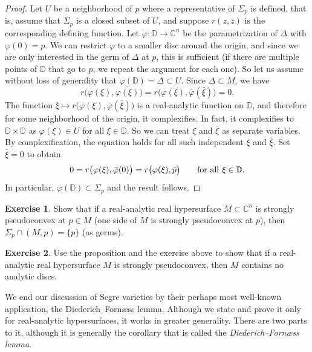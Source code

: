 \documentclass[12pt,openany]{book}
\newcommand{\avoidbreak}{\postdisplaypenalty=100}
\newcommand{\C}{{\mathbb{C}}}
\newcommand{\D}{{\mathbb{D}}}
\newcommand{\myindex}[1]{#1\index{#1}}
\theoremstyle{plain}
\theoremstyle{remark}
\theoremstyle{definition}
\newenvironment{exbox}{%
    \def\FrameCommand{\vrule width 1pt \relax\hspace{10pt}}%
    \MakeFramed{\advance\hsize-\width\FrameRestore}%
}{%
    \endMakeFramed
}
\theoremstyle{exercise}
\newtheorem{exercise}{Exercise}[section]
\theoremstyle{example}
\begin{document}
\begin{proof}
Let $U$ be a neighborhood of $p$ where a representative
of $\Sigma_p$ is defined, that is, assume that $\Sigma_p$ is
a closed subset of $U$, and suppose $r(z,\bar{z})$ is the corresponding
defining function.
Let $\varphi \colon \D \to \C^n$ be the parametrization of $\Delta$
with $\varphi(0) = p$.  We can restrict $\varphi$ to a smaller disc around the
origin, and since we are only interested in the germ of $\Delta$ at $p$, this
is sufficient (if there are multiple points of $\D$
that go to $p$, we repeat the argument for each one).
So let us assume without loss of generality that $\varphi(\D) = \Delta \subset U$.
Since $\Delta \subset M$, we have
\begin{equation*}
r\bigl(\varphi(\xi),\overline{\varphi(\xi)}\bigr) =
r\bigl(\varphi(\xi),\bar{\varphi}(\bar{\xi})\bigr) = 0 .
\end{equation*}
The function $\xi \mapsto
r\bigl(\varphi(\xi),\bar{\varphi}(\bar{\xi})\bigr)$ is a real-analytic
function on $\D$, and therefore for some
neighborhood of the origin, it complexifies.  In fact, it complexifies
to $\D \times \D$ as $\varphi(\xi) \in U$ for all $\xi \in \D$.
So we can treat $\xi$ and $\bar{\xi}$ as separate variables.  By
complexification, the equation holds for all such independent
$\xi$ and $\bar{\xi}$.  Set $\bar{\xi} = 0$ to obtain
\begin{equation*}
0 =
r\bigl(\varphi(\xi),\bar{\varphi}(0)\bigr) =
r\bigl(\varphi(\xi),\bar{p}\bigr)
\qquad \text{for all $\xi \in \D$}.
\avoidbreak
\end{equation*}
In particular, $\varphi(\D) \subset \Sigma_p$ and the result follows.
\end{proof}

\begin{exbox}
\begin{exercise}
Show that if a real-analytic real hypersurface $M \subset \C^n$ is strongly
pseudoconvex at $p \in M$ (one side of $M$ is strongly pseudoconvex at $p$),
then $\Sigma_p \cap
(M,p) = \{p\}$ (as germs).
\end{exercise}

\begin{exercise}
Use the proposition and the exercise above to show that if a real-analytic
real hypersurface $M$ is strongly
pseudoconvex, then $M$ contains no analytic discs.
\end{exercise}
\end{exbox}

We end our discussion of Segre varieties by their perhaps most well-known
application, the Diederich--Forn\ae ss lemma.  Although
we state and prove it only for real-analytic hypersurfaces,
it works in greater generality.
There are two parts to it, although it is generally the corollary
that is called the \emph{\myindex{Diederich--Forn\ae ss lemma}}.
\end{document}
